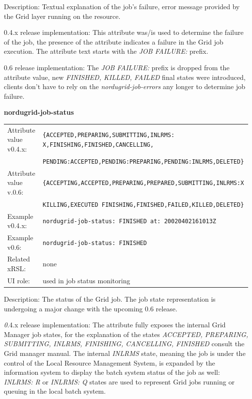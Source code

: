 \documentclass{article}
\begin{document}
Description:  Textual explanation of the job's failure, error message provided by the
Grid layer running on the resource.
 
0.4.x release implementation:
This attribute was/is used to determine the failure of the job, the  presence of the
attribute indicates a failure in the Grid job execution. 
The attribute text starts with the {\it JOB FAILURE: } prefix.

0.6 release implementation:
The {\it JOB FAILURE: } prefix is dropped from the attribute value,
new {\it FINISHED, KILLED, FAILED} final states were introduced, clients 
don't have to rely on the {\it nordugrid-job-errors} any longer to 
determine job failure.



  \hspace*{0.5cm}
  \begin{shaded}
    \textbf{nordugrid-job-status}
  \end{shaded}
  \begin{tabular}{lp{10cm}}  
    Attribute value v0.4.x:& \verb#{ACCEPTED,PREPARING,SUBMITTING,INLRMS: X,FINISHING,FINISHED,CANCELLING,#\\
                           & \verb#PENDING:ACCEPTED,PENDING:PREPARING,PENDING:INLRMS,DELETED}#\\
    Attribute value v.0.6:& \verb#{ACCEPTING,ACCEPTED,PREPARING,PREPARED,SUBMITTING,INLRMS:X#\\
    & \verb#KILLING,EXECUTED FINISHING,FINISHED,FAILED,KILLED,DELETED}#\\ 
    Example v0.4.x:&  \verb#nordugrid-job-status: FINISHED at: 20020402161013Z#\\
    Example v0.6:& \verb#nordugrid-job-status: FINISHED#\\ 
    Related xRSL:& none\\
    UI role:& used in job status monitoring 
  \end{tabular}

Description: The status of the Grid job. The job state representation 
is undergoing a major change with the upcoming 0.6 release.

{\emph 0.4.x release implementation:} 
The attribute fully exposes the internal Grid Manager job states,
for the explanation of the states {\it ACCEPTED, PREPARING, SUBMITTING, INLRMS, FINISHING, 
CANCELLING, FINISHED} consult the Grid manager manual\cite{grid-manager}. 
The internal {\it INLRMS} state, meaning the job is under the 
control of the Local Resource Management System, is expanded by the 
information system to display the batch system status of the job as well:
{\it INLRMS: R} or  {\it INLRMS: Q} states are used to represent Grid jobs running 
or queuing  in the local batch system.
\end{document}
